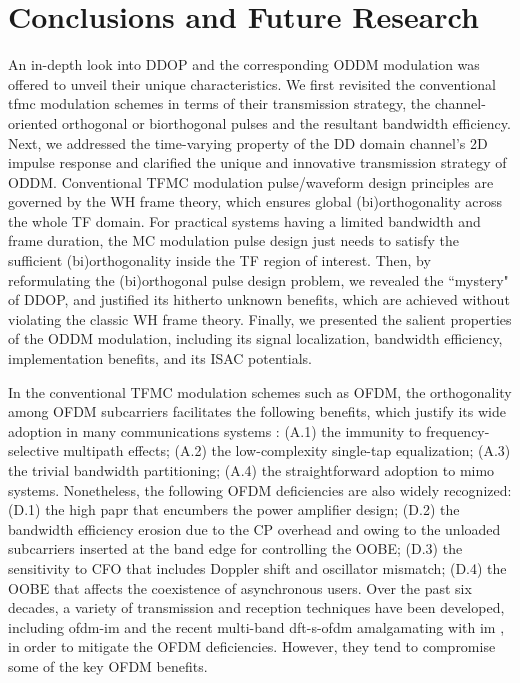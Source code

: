 \documentclass[journal]{IEEEtran}
\begin{document}
{\section{Conclusions and Future Research}
An in-depth look into DDOP and the corresponding ODDM modulation was offered to unveil their unique characteristics.
We first revisited the conventional \ac{tfmc} modulation schemes in terms of their transmission strategy, the channel-oriented orthogonal or biorthogonal pulses and the resultant bandwidth efficiency. Next, we addressed the %
time-varying property of the DD domain channel's 2D impulse response and clarified the unique and innovative transmission strategy of ODDM. 
Conventional TFMC modulation pulse/waveform design principles are governed by the WH frame theory, which ensures global (bi)orthogonality across the whole TF domain. For practical systems having a limited bandwidth and frame duration, the MC modulation pulse design just needs to satisfy the sufficient (bi)orthogonality inside the TF region of interest. 
Then, by reformulating the (bi)orthogonal pulse design problem, we revealed the ``mystery" of DDOP, and justified its hitherto unknown benefits, which are achieved without violating the classic WH frame theory. Finally, we presented the salient properties of the ODDM modulation, including its signal localization, bandwidth efficiency, implementation benefits, and its ISAC potentials.



In the conventional TFMC modulation schemes such as OFDM, the orthogonality among OFDM subcarriers facilitates the following benefits, which justify its wide adoption in many communications systems \cite{ofdm,tff,mct,keller_proc_ieee_2000,jiang_proc_ieee_2007,weinstein2009,mc_book_lly_2009}: (A.1) the immunity to frequency-selective multipath effects; (A.2) the low-complexity single-tap equalization; (A.3) the trivial bandwidth partitioning; (A.4) the straightforward adoption to \ac{mimo} systems. Nonetheless, the following OFDM deficiencies are also widely recognized: (D.1) the high \ac{papr} that encumbers the power amplifier design; (D.2) the bandwidth efficiency erosion due to the CP overhead and owing to the unloaded subcarriers inserted at the band edge for controlling the OOBE; (D.3) the sensitivity to CFO that includes Doppler shift and oscillator mismatch; (D.4) the OOBE that affects the coexistence of asynchronous users. Over the past six decades, a variety of transmission and reception techniques have been developed, including \ac{ofdm-im}\cite{ofdm-im} and the recent multi-band \ac{dft-s-ofdm} amalgamating with \ac{im} \cite{hanzo1}, in order to mitigate the OFDM deficiencies. However, they tend to compromise some of the key OFDM benefits. 

}
\end{document}
